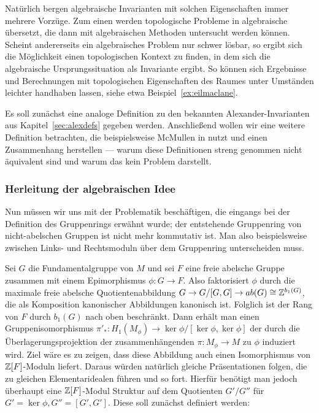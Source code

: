 Natürlich bergen algebraische Invarianten mit solchen Eigenschaften immer mehrere Vorzüge. Zum einen werden topologische Probleme in algebraische übersetzt, die dann mit algebraischen Methoden untersucht werden können. Scheint andererseits ein algebraisches Problem nur schwer lösbar, so ergibt sich die Möglichkeit einen topologischen Kontext zu finden, in dem sich die algebraische Ursprungssituation als Invariante ergibt. So können sich Ergebnisse und Berechnungen mit topologischen Eigenschaften des Raumes unter Umständen leichter handhaben lassen, siehe etwa Beispiel~\ref{ex:eilmaclane}.

Es soll zunächst eine analoge Definition zu den bekannten Alexander-Invarianten aus Kapitel~\ref{sec:alexdefs} gegeben werden. Anschließend wollen wir eine weitere Definition betrachten, die beispielsweise McMullen in \cite{MCMULLEN.2002} nutzt und einen Zusammenhang herstellen --- warum diese Definitionen streng genommen nicht äquivalent sind und warum das kein Problem darstellt.

\subsubsection*{Herleitung der algebraischen Idee}
    
Nun müssen wir uns mit der Problematik beschäftigen, die eingangs bei der Definition des Gruppenrings erwähnt wurde; der entstehende Gruppenring von nicht-abelschen Gruppen ist nicht mehr kommutativ ist. Man also beispielsweise zwischen Links- und Rechtsmoduln über dem Gruppenring unterscheiden muss.

Sei $G$ die Fundamentalgruppe von $M$ und sei $F$ eine freie abelsche Gruppe zusammen mit einem Epimorphismus $\phi:G \to F$. Also faktorisiert $\phi$ durch die maximale freie abelsche Quotientenabbildung $G \to G/[G,G] \to ab(G) \cong \mathbb{Z}^{b_1(G)}$, die als Komposition kanonischer Abbildungen kanonisch ist. Folglich ist der Rang von $F$ durch $b_1(G)$ nach oben beschränkt. Dann erhält man einen Gruppenisomorphismus $\pi'_*: H_1(M_\phi) \to \ker\phi/[\ker\phi,\ker\phi]$ der durch die Überlagerungsprojektion der zusammenhängenden $\pi: M_\phi \to M$ zu $\phi$ induziert wird. Ziel wäre es zu zeigen, dass diese Abbildung auch einen Isomorphismus von $\mathbb{Z}[F]$-Moduln liefert. Daraus würden natürlich gleiche Präsentationen folgen, die zu gleichen Elementaridealen führen und so fort. Hierfür benötigt man jedoch überhaupt eine $\mathbb{Z}[F]$-Modul Struktur auf dem Quotienten $G'/G''$ für $G'=\ker\phi, G''=[G',G']$. Diese soll zunächst definiert werden:


